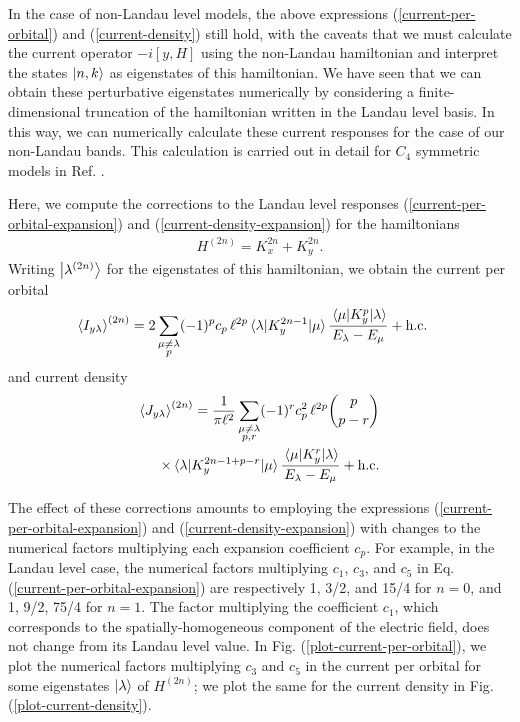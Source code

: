 \documentclass[aps,prb,twocolumn,letterpaper,twoside,nobalancelastpage,groupedaddress,amsmath,amssymb,floatfix,citeautoscript]{revtex4-1}
\begin{document}
In the case of non-Landau level models, the above expressions (\ref{current-per-orbital}) and (\ref{current-density}) still hold, with the caveats that we must calculate the current operator $-i[y,H]$ using the non-Landau hamiltonian and interpret the states $\ket{n,k}$ as eigenstates of this hamiltonian. We have seen that we can obtain these perturbative eigenstates numerically by considering a finite-dimensional truncation of the hamiltonian written in the Landau level basis. In this way, we can numerically calculate these current responses for the case of our non-Landau bands. This calculation is carried out in detail for $C_4$ symmetric models in Ref. .

Here, we compute the corrections to the Landau level responses (\ref{current-per-orbital-expansion}) and (\ref{current-density-expansion}) for the hamiltonians
\begin{align*}
H^{(2n)} = K_x^{2n} + K_y^{2n}.
\end{align*}
Writing $\ket{\lambda^{(2n)}}$ for the eigenstates of this hamiltonian, we obtain the current per orbital
\begin{align*}
\expval{I_{y\lambda}}^{(2n)} = 2\sum_{\substack{\mu\neq\lambda\\p}}&(-1)^pc_p\,\ell^{2p} \mel{\lambda}{K_y^{2n-1}}{\mu}\frac{\mel{\mu}{K_y^p}{\lambda}}{E_{\lambda}-E_{\mu}} + \text{h.c.}
\end{align*}
and current density
\begin{align*}
\expval{J_{y\lambda}}^{(2n)} = \frac{1}{\pi \ell^2}\sum_{\substack{\mu\neq\lambda\\p,r}} (-1)^{r} c_p^2\,\ell^{2p} \binom{p}{p-r}\\\times\mel{\lambda}{K_y^{2n-1+p-r}}{\mu}\frac{\mel{\mu}{K_y^r}{\lambda}}{E_{\lambda}-E_{\mu}} + \text{h.c.}
\end{align*}

The effect of these corrections amounts to employing the expressions (\ref{current-per-orbital-expansion}) and (\ref{current-density-expansion}) with changes to the numerical factors multiplying each expansion coefficient $c_p$. For example, in the Landau level case, the numerical factors multiplying $c_1$, $c_3$, and $c_5$ in Eq. (\ref{current-per-orbital-expansion}) are respectively 1, 3/2, and 15/4 for $n=0$, and 1, 9/2, 75/4 for $n=1$. The factor multiplying the coefficient $c_1$, which corresponds to the spatially-homogeneous component of the electric field, does not change from its Landau level value. In Fig. (\ref{plot-current-per-orbital}), we plot the numerical factors multiplying $c_3$ and $c_5$ in the current per orbital for some eigenstates $\ket{\lambda}$ of $H^{(2n)}$; we plot the same for the current density in Fig. (\ref{plot-current-density}).
\end{document}
